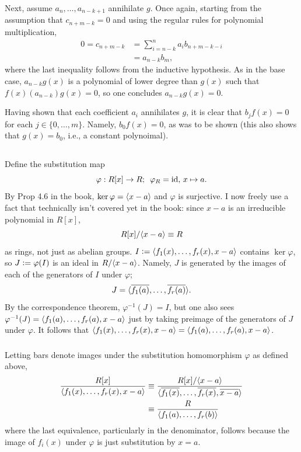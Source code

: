 \documentclass[12pt]{article}
\begin{document}
Next, assume $a_{n}, \ldots, a_{n - k + 1}$ annihilate $g$. 
Once again, starting from the assumption that $c_{n + m - k} = 0$ and using the regular rules for polynomial multiplication, 
\begin{align*}
  0 = c_{n + m - k} & = \sum_{i = n-k}^{n} a_{i}b_{n + m - k - i} \\ 
                    & = a_{n - k}b_m,
\end{align*}
where the last inequality follows from the inductive hypothesis. 
As in the base case, $a_{n - k}g(x)$ is a polynomial of lower degree than $g(x)$ such that $f(x) (a_{n - k})g(x) = 0$, so one concludes $a_{n - k}g(x) = 0$. 

Having shown that each coefficient $a_{i}$ annihilates $g$, it is clear that $b_j f(x) = 0$ for each $j \in \{0, \ldots, m\}$. 
Namely, $b_0 f(x) = 0$, as was to be shown (this also shows that $g(x) = b_0$, i.e., a constant polynoimal). 

\setcounter{subsection}{10}
\subsection{} 
\subsubsection{}
Define the substitution map 
$$\varphi:R[x] \rightarrow R; \hspace{0.5em} \varphi_{R} = \text{id}, \, x \mapsto a.$$
By Prop 4.6 in the book, $\ker \varphi = \langle x - a\rangle$ and $\varphi$ is surjective. 
I now freely use a fact that technically isn't covered yet in the book: 
since $x - a$ is an irreducible polynomial in $R[x]$, 
$$R[x] / \<x - a\> \equiv R$$ 
as rings, not just as abelian groups. 
$I \vcentcolon= \langle f_1(x), \ldots, f_r(x), x - a\rangle$ contains $\ker \varphi$, so $J \vcentcolon= \varphi(I)$ is an ideal in $R / \langle x - a\rangle$. 
Namely, $J$ is generated by the images of each of the generators of $I$ under $\varphi$; 
$$J = \langle\overline{f_1(a)}, \ldots, \overline{f_r(a)}\rangle.$$ 
By the correspondence theorem, $\varphi^{-1}(J) = I$, but one also sees $\varphi^{-1}(J) = \langle f_1(a), \ldots, f_r(a), x - a\rangle$ just by taking preimage of the generators of $J$ under $\varphi$.  
It follows that $\langle f_1(x), \ldots, f_r(x), x - a\rangle = \langle f_1(a), \ldots, f_r(a), x - a\rangle$. 

\subsubsection{}
Letting bars denote images under the substitution homomorphism $\varphi$ as defined above, 
\begin{align*}
  \frac{R[x]}{\<f_1(x), \ldots, f_r(x), x - a\>} & \equiv \frac{R[x] / \<x - a\>}{\<\overline{f_1(x)}, \ldots, \overline{f_r(x)}, \overline{x - a}\>} \\ 
                                                 & \equiv \frac{R}{\<f_1(a), \ldots, f_r(b)\>}
\end{align*}
where the last equivalence, particularly in the denominator, follows because the image of $f_i(x)$ under $\varphi$ is just substitution by $x = a$. 
\end{document}
